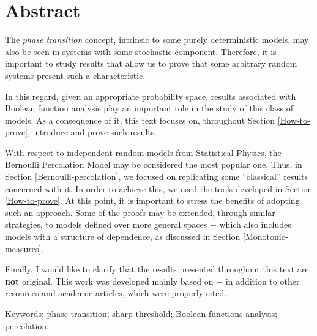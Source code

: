 \newpage

\section*{\Large \hspace*{\fill} \textbf{Abstract} \hspace*{\fill}}

The \textit{phase transition} concept, intrinsic to some purely deterministic models, may also be seen in systems with some stochastic component. Therefore, it is important to study results that allow us to prove that some arbitrary random systems present such a characteristic.

In this regard, given an appropriate probability space, results associated with Boolean function analysis play an important role in the study of this class of models. As a consequence of it, this text focuses on, throughout Section \ref{How-to-prove}, introduce and prove such results. 

With respect to independent random models from Statistical Physics, the Bernoulli Percolation Model may be considered the most popular one. Thus, in Section \ref{Bernoulli-percolation}, we focused on replicating some ``classical'' results concerned with it. In order to achieve this, we used the tools developed in Section \ref{How-to-prove}. At this point, it is important to stress the benefits of adopting such an approach. Some of the proofs may be extended, through similar strategies, to models defined over more general spaces $-$ which also includes models with a structure of dependence, as discussed in Section \ref{Monotonic-measures}.

Finally, I would like to clarify that the results presented throughout this text are \textbf{not} original. This work was developed mainly based on \cite{duminil2019sharp} $-$ in addition to other resources and academic articles, which were properly cited.

\vspace{12pt}
\par Keywords: phase transition; sharp threshold; Boolean functions analysis; percolation.
